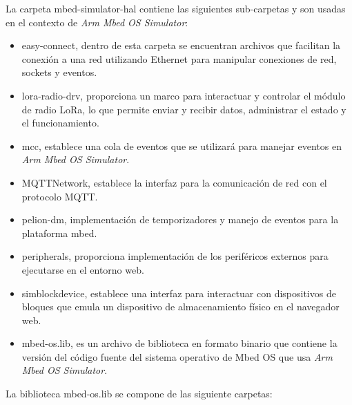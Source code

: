 La carpeta \textquotedbl mbed-simulator-hal\textquotedbl{}  contiene las siguientes sub-carpetas y son usadas en el contexto de \textit{Arm Mbed OS Simulator}: 

\begin{itemize}
	\item easy-connect, dentro de esta carpeta se encuentran archivos que facilitan la conexión a una red utilizando Ethernet para manipular conexiones de red, sockets y eventos.
	
	\item lora-radio-drv, proporciona un marco para interactuar y controlar el módulo de radio LoRa, lo que permite enviar y recibir datos, administrar el estado y el funcionamiento.

	\item mcc, establece una cola de eventos que se utilizará para manejar eventos en \textit{Arm Mbed OS Simulator}. 
	
	\item MQTTNetwork, establece la interfaz para la comunicación de red con el protocolo MQTT. 
	
	\item pelion-dm, implementación de temporizadores y manejo de eventos para la plataforma mbed.
	
	\item peripherals, proporciona implementación de los periféricos externos para ejecutarse en el entorno web.
	
	\item simblockdevice, establece una interfaz para interactuar con  dispositivos de bloques que emula un dispositivo de almacenamiento físico en el navegador web.
	
	\item mbed-os.lib, es un archivo de biblioteca en formato binario que contiene la versión del código fuente del sistema operativo de Mbed OS  que usa \textit{Arm Mbed OS Simulator}.
	
\end{itemize}

La biblioteca \textquotedbl mbed-os.lib\textquotedbl{} se compone de las siguiente carpetas: 

